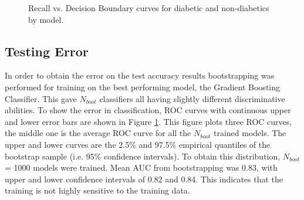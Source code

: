 \documentclass{article} %
\begin{document}
\begin{figure}[h]
\begin{center}
\end{center}
\caption{Recall vs. Decision Boundary curves for diabetic and non-diabetics by model.}
\label{roc_error_decision}
\end{figure}

\subsection{Testing Error}
In order to obtain the error on the test accuracy results bootstrapping was performed for training on the best performing model, the Gradient Boosting Classifier. This gave $N_{boot}$ classifiers all having slightly different discriminative abilities. To show the error in classification, ROC curves with continuous upper and lower error bars are shown in Figure \ref{roc_error_decision}. This figure plots three ROC curves, the middle one is the average ROC curve for all the $N_{boot}$ trained models. The upper and lower curves are the 2.5\% and 97.5\% empirical quantiles of the bootstrap sample (i.e. 95\% confidence intervals). To obtain this distribution, $N_{boot}$ = 1000 models were trained. Mean AUC from bootstrapping was 0.83, with upper and lower confidence intervals of 0.82 and 0.84. This indicates that the training is not highly sensitive to the training data.
\end{document}
